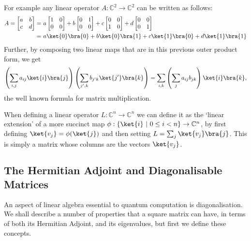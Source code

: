 For example any linear operator $A: \mathbb{C}^2 \to \mathbb{C}^2$ can be written as follows:
\begin{align*}
	A = \left[\begin{matrix}
		a&b\\
		c&d
	\end{matrix}\right]
	=&\ 
	a\left[\begin{matrix}
		1&0\\
		0&0
	\end{matrix}\right]
	+
	b\left[\begin{matrix}
		0&1\\
		0&0
	\end{matrix}\right]
	+
	c\left[\begin{matrix}
		0&0\\
		1&0
	\end{matrix}\right]
	+
	d\left[\begin{matrix}
		0&0\\
		0&1
	\end{matrix}\right]
	\\=&\  a\ket{0}\bra{0}+b\ket{0}\bra{1}+c\ket{1}\bra{0}+d\ket{1}\bra{1}
\end{align*}
Further, by composing two linear maps that are in this previous outer product form, we get
\[\left(\sum_{i,j}a_{ij}\ket{i}\bra{j}\right)\left(\sum_{j',k}b_{j'k}\ket{j'}\bra{k}\right) = \sum_{i,k}\left(\sum_j a_{ij}b_{jk}\right)\ket{i}\bra{k},\]
the well known formula for matrix multiplication.

When defining a linear operator $L: \mathbb{C}^n \to \mathbb{C}^n$ we can define it as the `linear extension' of a more succinct map $\phi: \{\ket{i}\ |\ 0 \leq i < n\} \to \mathbb{C}^n$, by first defining $\ket{v_j} = \phi(\ket{j})$ and then setting $L = \sum_{j} \ket{v_j}\bra{j}$. This is simply a matrix whose columns are the vectors $\ket{v_j}$.
\subsection{The Hermitian Adjoint and Diagonalisable Matrices}\label{diagonalisable}
An aspect of linear algebra essential to quantum computation is diagonalisation. We shall describe a number of properties that a square matrix can have, in terms of both its Hermitian Adjoint, and its eigenvalues, but first we define these concepts.

